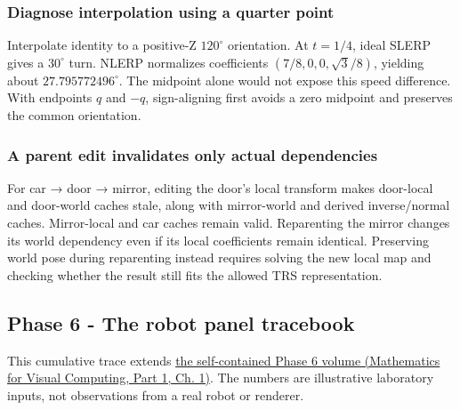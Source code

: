 \subsubsection{Diagnose interpolation using a quarter point}\label{appendix-92ff77d4dfdc-diagnose-interpolation-using-a-quarter-point}

\hypertarget{appendix-92ff77d4dfdc-diagnose-interpolation-using-a-quarter-point}{}

Interpolate identity to a positive-Z \(120^\circ\) orientation. At \(t=1/4\), ideal SLERP gives a \(30^\circ\) turn. NLERP normalizes coefficients \((7/8,0,0,\sqrt3/8)\), yielding about \(27.795772496^\circ\). The midpoint alone would not expose this speed difference. With endpoints \(q\) and \(-q\), sign-aligning first avoids a zero midpoint and preserves the common orientation.

\subsubsection{A parent edit invalidates only actual dependencies}\label{appendix-92ff77d4dfdc-a-parent-edit-invalidates-only-actual-dependencies}

\hypertarget{appendix-92ff77d4dfdc-a-parent-edit-invalidates-only-actual-dependencies}{}

For car → door → mirror, editing the door's local transform makes door-local and door-world caches stale, along with mirror-world and derived inverse/normal caches. Mirror-local and car caches remain valid. Reparenting the mirror changes its world dependency even if its local coefficients remain identical. Preserving world pose during reparenting instead requires solving the new local map and checking whether the result still fits the allowed TRS representation.

\subsection{Phase 6 - The robot panel tracebook}\label{appendix-92ff77d4dfdc-phase-6---the-robot-panel-tracebook}

\hypertarget{appendix-92ff77d4dfdc-phase-6---the-robot-panel-tracebook}{}

This cumulative trace extends \href{../02-Mathematics-for-Visual-Computing-P01/main.pdf\#nameddest=01-foundations-i-ch017-the-panel-gives-us-a-reason-to-learn}{the self-contained Phase 6 volume (Mathematics for Visual Computing, Part 1, Ch. 1)}. The numbers are illustrative laboratory inputs, not observations from a real robot or renderer.

